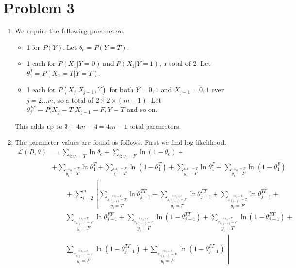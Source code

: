 \documentclass{article}
\begin{document}
\section*{Problem 3}
\begin{enumerate}
\item We require the following parameters.
  \begin{itemize}
  \item 1 for $P(Y)$. Let $\theta_c=P(Y=T)$.
  \item 1 each for $P(X_1|Y=0)$ and $P(X_1|Y=1)$, a total of 2. Let $\theta_1^T=P(X_1=T|Y=T)$.
  \item 1 each for $P(X_j|X_{j-1},Y)$ for both $Y=0,1$ and $X_{j-1}=0,1$
    over $j=2\ldots m$, so a total of $2\times 2\times (m-1)$. Let $\theta_j^{FT}=P(X_j=T|X_{j-1}=F,Y=T$ and so on.
  \end{itemize}
  This adds up to $3+4m-4=4m-1$ total parameters.
\item The parameter values are found as follows. First we find log likelihood.
  \begin{align*}
    \mathcal L(D,\theta) &=
    \sum_{i:y_i=T}\ln \theta_c + \sum_{i:y_i=F}\ln (1-\theta_c) + \\ &
    + \sum_{\stackrel{i:x_{i1}=T}{y_i=T}} \ln \theta_1^T + \sum_{\stackrel{i:x_{i1}=F}{y_i=T}}\ln\left(1-\theta_1^T\right)
    + \sum_{\stackrel{i:x_{i1}=T}{y_i=F}} \ln \theta_1^F + \sum_{\stackrel{i:x_{i1}=F}{y_i=F}}\ln\left(1-\theta_1^F\right)\\
    &\qquad + \sum_{j=2}^{m}
    \left[
      \sum_{\stackrel{\stackrel{i:x_{ij}=T}{x_{i(j-1)}=T}}{y_i=T}}\ln \theta_{j-1}^{TT} +
      \sum_{\stackrel{\stackrel{i:x_{ij}=T}{x_{i(j-1)}=F}}{y_i=T}}\ln \theta_{j-1}^{FT} +
      \sum_{\stackrel{\stackrel{i:x_{ij}=T}{x_{i(j-1)}=T}}{y_i=F}}\ln \theta_{j-1}^{TF} +  \right.\\
      &\qquad\sum_{\stackrel{\stackrel{i:x_{ij}=T}{x_{i(j-1)}=F}}{y_i=F}}\ln \theta_{j-1}^{FF} +
      \sum_{\stackrel{\stackrel{i:x_{ij}=F}{x_{i(j-1)}=T}}{y_i=T}}\ln\left(1-\theta_{j-1}^{TT}\right) +
      \sum_{\stackrel{\stackrel{i:x_{ij}=F}{x_{i(j-1)}=F}}{y_i=T}}\ln\left(1-\theta_{j-1}^{FT}\right) +\\
      &\qquad\left.\sum_{\stackrel{\stackrel{i:x_{ij}=F}{x_{i(j-1)}=T}}{y_i=F}}\ln\left(1-\theta_{j-1}^{TF}\right) +
      \sum_{\stackrel{\stackrel{i:x_{ij}=F}{x_{i(j-1)}=F}}{y_i=F}}\ln (1-\theta_{j-1}^{FF})
      \right] \\
  \end{align*}


\end{enumerate}
\end{document}
